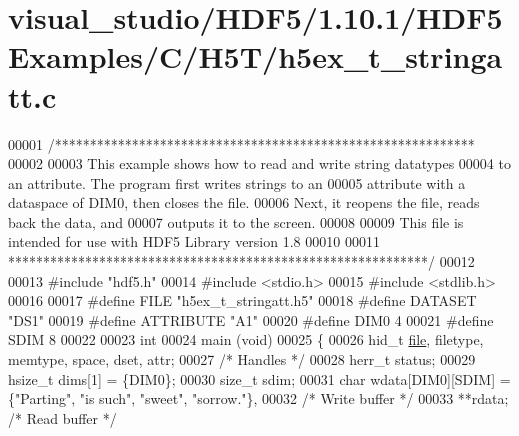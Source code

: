 \hypertarget{visual__studio_2_h_d_f5_21_810_81_2_h_d_f5_examples_2_c_2_h5_t_2h5ex__t__stringatt_8c_source}{}\section{visual\+\_\+studio/\+H\+D\+F5/1.10.1/\+H\+D\+F5\+Examples/\+C/\+H5\+T/h5ex\+\_\+t\+\_\+stringatt.c}
\label{visual__studio_2_h_d_f5_21_810_81_2_h_d_f5_examples_2_c_2_h5_t_2h5ex__t__stringatt_8c_source}

\begin{DoxyCode}
00001 \textcolor{comment}{/************************************************************}
00002 \textcolor{comment}{}
00003 \textcolor{comment}{  This example shows how to read and write string datatypes}
00004 \textcolor{comment}{  to an attribute.  The program first writes strings to an}
00005 \textcolor{comment}{  attribute with a dataspace of DIM0, then closes the file.}
00006 \textcolor{comment}{  Next, it reopens the file, reads back the data, and}
00007 \textcolor{comment}{  outputs it to the screen.}
00008 \textcolor{comment}{}
00009 \textcolor{comment}{  This file is intended for use with HDF5 Library version 1.8}
00010 \textcolor{comment}{}
00011 \textcolor{comment}{ ************************************************************/}
00012 
00013 \textcolor{preprocessor}{#include "hdf5.h"}
00014 \textcolor{preprocessor}{#include <stdio.h>}
00015 \textcolor{preprocessor}{#include <stdlib.h>}
00016 
00017 \textcolor{preprocessor}{#define FILE            "h5ex\_t\_stringatt.h5"}
00018 \textcolor{preprocessor}{#define DATASET         "DS1"}
00019 \textcolor{preprocessor}{#define ATTRIBUTE       "A1"}
00020 \textcolor{preprocessor}{#define DIM0            4}
00021 \textcolor{preprocessor}{#define SDIM            8}
00022 
00023 \textcolor{keywordtype}{int}
00024 main (\textcolor{keywordtype}{void})
00025 \{
00026     hid\_t       \hyperlink{structfile}{file}, filetype, memtype, space, dset, attr;
00027                                             \textcolor{comment}{/* Handles */}
00028     herr\_t      status;
00029     hsize\_t     dims[1] = \{DIM0\};
00030     \textcolor{keywordtype}{size\_t}      sdim;
00031     \textcolor{keywordtype}{char}        wdata[DIM0][SDIM] = \{\textcolor{stringliteral}{"Parting"}, \textcolor{stringliteral}{"is such"}, \textcolor{stringliteral}{"sweet"}, \textcolor{stringliteral}{"sorrow."}\},
00032                                             \textcolor{comment}{/* Write buffer */}
00033                 **rdata;                    \textcolor{comment}{/* Read buffer */}

\end{DoxyCode}

